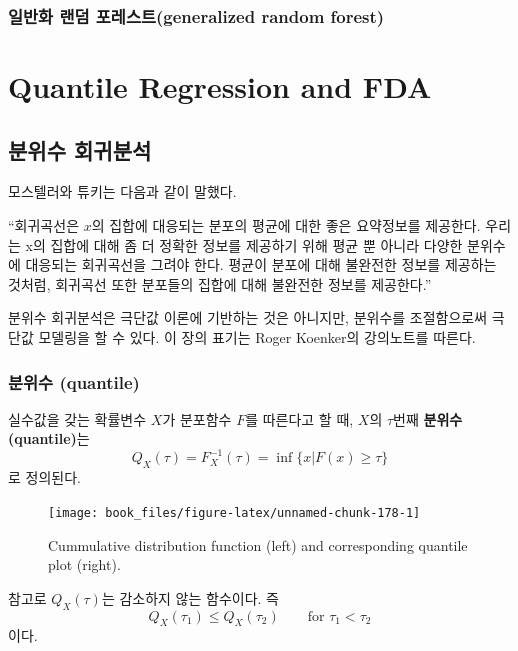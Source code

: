 \documentclass[b5paper,]{scrbook}
\theoremstyle{plain}
\theoremstyle{definition}
\numberwithin{equation}{section}
\let\BeginKnitrBlock\begin \let\EndKnitrBlock\end
\begin{document}
\section{일반화 랜덤 포레스트(generalized random
forest)}\label{--generalized-random-forest}

\part{Quantile Regression and
FDA}\label{part-quantile-regression-and-fda}

\chapter{분위수 회귀분석}\label{qr}

모스텔러와 튜키는 다음과 같이 말했다.

``회귀곡선은 \(x\)의 집합에 대응되는 분포의 평균에 대한 좋은 요약정보를
제공한다. 우리는 x의 집합에 대해 좀 더 정확한 정보를 제공하기 위해 평균
뿐 아니라 다양한 분위수에 대응되는 회귀곡선을 그려야 한다. 평균이 분포에
대해 불완전한 정보를 제공하는 것처럼, 회귀곡선 또한 분포들의 집합에 대해
불완전한 정보를 제공한다.''

분위수 회귀분석은 극단값 이론에 기반하는 것은 아니지만, 분위수를
조절함으로써 극단값 모델링을 할 수 있다. 이 장의 표기는 Roger Koenker의
강의노트를 따른다.

\section{분위수 (quantile)}\label{-quantile}

\BeginKnitrBlock{definition}[분위수]
\protect\hypertarget{def:unnamed-chunk-177}{}{\label{def:unnamed-chunk-177}
{} }실수값을 갖는 확률변수 \(X\)가 분포함수 \(F\)를
따른다고 할 때, \(X\)의 \(\tau\)번째 \textbf{분위수(quantile)}는
\[Q_{X}(\tau)=F_{X}^{-1}(\tau)=\inf\{x|F(x)\geq \tau\}\] 로 정의된다.
\EndKnitrBlock{definition}

\begin{figure}

{\centering \texttt{[image: book\_files/figure-latex/unnamed-chunk-178-1]} 

}

\caption{Cummulative distribution function (left) and corresponding quantile plot (right).}\label{fig:unnamed-chunk-178}
\end{figure}

참고로 \(Q_{X}(\tau)\)는 감소하지 않는 함수이다. 즉
\[Q_{X}(\tau_{1}) \leq Q_{X}(\tau_{2}) \qquad{ \text{for } \tau_{1} < \tau_{2}}\]
이다.
\end{document}

